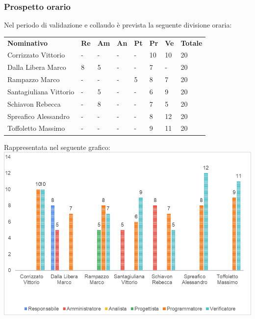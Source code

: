 \subsubsection{Prospetto orario}
Nel periodo di validazione e collaudo è prevista la seguente divisione oraria:
\begin{longtable} {				
		>{}p{40mm}  
		>{}p{8mm}
		>{}p{8mm}
		>{}p{8mm}
		>{}p{8mm}
		>{}p{8mm}
		>{}p{8mm}
		>{}p{12mm}			
	}			
	\rowcolor{gray!50}
	\textbf{Nominativo} & \textbf{Re} & \textbf{Am} & \textbf{An} & \textbf{Pt} & \textbf{Pr} & \textbf{Ve} & \textbf{Totale}	\TBstrut \\ [2mm]
	Corrizzato Vittorio & - & - & - & - & 10 & 10 & 20 \TBstrut \\ [2mm]
	Dalla Libera Marco & 8 & 5 & - & - & 7 & - & 20 \TBstrut \\ [2mm]
	Rampazzo Marco & - & - & - & 5 & 8 & 7 & 20 \TBstrut \\ [2mm]
	Santagiuliana Vittorio & - & 5 & - & - & 6 & 9 & 20 \TBstrut \\ [2mm]
	Schiavon Rebecca & - & 8 & - & - & 7 & 5 & 20 \TBstrut \\ [2mm]
	Spreafico Alessandro & - & - & - & - & 8 & 12 & 20 \TBstrut \\ [2mm]
	Toffoletto Massimo & - & - & - & - & 9 & 11 & 20 \TBstrut \\ [2mm]
\end{longtable}
Rappresentata nel seguente grafico: \\
\includegraphics[width=\linewidth]{./img/Grafici/7.png}

